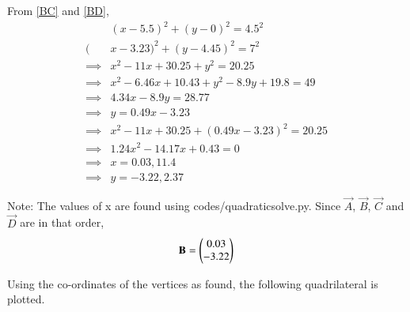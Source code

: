 \documentclass[journal,12pt,twocolumn]{IEEEtran}
\begin{document}
From \ref{BC} and \ref{BD},
\begin{align}
    &(x-5.5)^2+(y-0)^2 =4.5^2\\
    (&x-3.23)^2+(y-4.45)^2 =7^2\\
    \implies &x^2-11x+30.25+y^2=20.25\\
    \implies &x^2-6.46x+10.43+y^2-8.9y+19.8=49\\
    \implies &4.34x-8.9y=28.77\\
    \implies &y = 0.49x-3.23\\
    \implies &x^2-11x+30.25+(0.49x-3.23)^2 = 20.25\\
    \implies &1.24x^2-14.17x+0.43=0\\
    \implies &x = 0.03, 11.4\\
    \implies &y = -3.22, 2.37
\end{align}

Note: The values of x are found using codes/quadratic\textunderscore solve.py. Since $\vec{A}$, $\vec{B}$, $\vec{C}$ and $\vec{D}$ are in that order, 
\begin{equation}
    \mathbf{B} = \begin{pmatrix}0.03\\-3.22\end{pmatrix}
\end{equation}

Using the co-ordinates of the vertices as found, the following quadrilateral is plotted.
\begin{figure}[h]
\end{figure}
\end{document}
